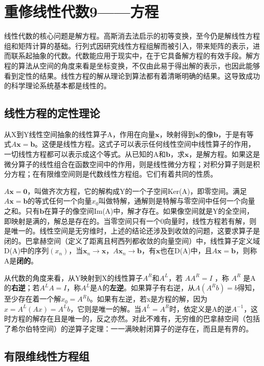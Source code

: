 \section{重修线性代数9——方程}

线性代数的核心问题是解方程。高斯消去法启示的初等变换，至今仍是解线性方程组和矩阵计算的基础。行列式因研究线性方程组解而被引入，带来矩阵的表示，进而联系起抽象的代数。代数能应用于现实中，在于它具备解方程的有效手段。解方程的算法从空间的角度来看是坐标变换，不仅由此易于得出解的表示，也因此能够看到定性的结果。线性方程的解从理论到算法都有着清晰明确的结果。这导致成功的科学理论系统基本都是线性的。

\subsection{线性方程的定性理论}

从X到Y线性空间抽象的线性算子A，作用在向量$ \bm{x} $，映射得到$ \bm{x} $的像$ \bm{b} $，于是有等式$ A\bm{x}=\bm{b} $。这便是线性方程。这式子可以表示任何线性空间中线性算子的作用，一切线性方程都可以表示成这个等式。从已知的A和$ \bm{b} $，求$ \bm{x} $，是解方程。如果这是微分算子的线性组合在函数空间中的作用，则是线性微分方程；对积分算子则是积分方程；在有限维空间则是代数线性方程组。它们有着共同的性质。

$ A\bm{x}=\bm{0} $，叫做齐次方程，它的解构成Y的一个子空间Ker(A)，即零空间。满足$ A\bm{x}=\bm{b} $的等式任何一个向量$ x_0 $叫做特解，通解则是特解与零空间中任何一个向量之和。只有$ \bm{b} $在算子的像空间Im(A)中，解才存在。如果像空间就是Y的全空间，即映射是满的，解总是存在的。当零空间只有一个0向量时，线性方程若有解，则是唯一的。线性空间是无穷维时，上述的结论还涉及到收敛的问题，这要求算子是闭的。巴拿赫空间（定义了距离且柯西列都收敛的向量空间）中，线性算子定义域D(A)中的序列$ (x_n) $，当$ \bm{x}_n\rightarrow \bm{x} ，A\bm{x}_n\rightarrow\bm{b}$，有$ \bm{x} $也在D(A)中，且$ A\bm{x}=\bm{b} $，则称A是\textbf{闭的}。

从代数的角度来看，从Y映射到X的线性算子$ A^R $和$ A^L $，若 $ AA^R= I $ ，称 $ A^R $ 是A的\textbf{右逆}；若$ A^LA=I $，称$ A^L $是A的\textbf{左逆}。如果算子有右逆，从$ A(A^R b)= b $得知，至少存在着一个解$ x_0=A^Rb $。如果有左逆，若x是方程的解，因为$ x=A^L(Ax)=A^Lb $，它则是唯一的解。当$ A^L=A^R $时，依定义是A的逆$ A^{-1} $，这时方程的解存在且是唯一的，反之亦然。对此不难有，无穷维的巴拿赫空间（包括了希尔伯特空间）的逆算子定理：一一满映射闭算子的逆存在，而且是有界的。

\subsection{有限维线性方程组}


